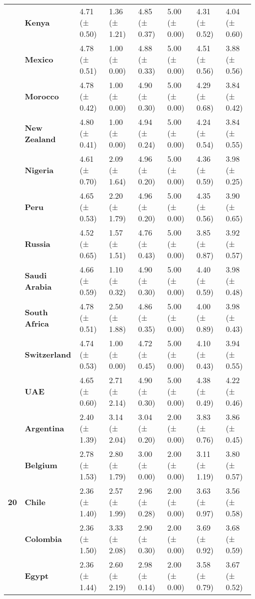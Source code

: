 \begin{tabular}{llllllll}
\textbf{} & \textbf{Kenya} & 4.71 (± 0.50) & 1.36 (± 1.21) & 4.85 (± 0.37) & 5.00 (± 0.00) & 4.31 (± 0.52) & 4.04 (± 0.60) \\
\textbf{} & \textbf{Mexico} & 4.78 (± 0.51) & 1.00 (± 0.00) & 4.88 (± 0.33) & 5.00 (± 0.00) & 4.51 (± 0.56) & 3.88 (± 0.56) \\
\textbf{} & \textbf{Morocco} & 4.78 (± 0.42) & 1.00 (± 0.00) & 4.90 (± 0.30) & 5.00 (± 0.00) & 4.29 (± 0.68) & 3.84 (± 0.42) \\
\textbf{} & \textbf{New Zealand} & 4.80 (± 0.41) & 1.00 (± 0.00) & 4.94 (± 0.24) & 5.00 (± 0.00) & 4.24 (± 0.54) & 3.84 (± 0.55) \\
\textbf{} & \textbf{Nigeria} & 4.61 (± 0.70) & 2.09 (± 1.64) & 4.96 (± 0.20) & 5.00 (± 0.00) & 4.36 (± 0.59) & 3.98 (± 0.25) \\
\textbf{} & \textbf{Peru} & 4.65 (± 0.53) & 2.20 (± 1.79) & 4.96 (± 0.20) & 5.00 (± 0.00) & 4.35 (± 0.56) & 3.90 (± 0.65) \\
\textbf{} & \textbf{Russia} & 4.52 (± 0.65) & 1.57 (± 1.51) & 4.76 (± 0.43) & 5.00 (± 0.00) & 3.85 (± 0.87) & 3.92 (± 0.57) \\
\textbf{} & \textbf{Saudi Arabia} & 4.66 (± 0.59) & 1.10 (± 0.32) & 4.90 (± 0.30) & 5.00 (± 0.00) & 4.40 (± 0.59) & 3.98 (± 0.48) \\
\textbf{} & \textbf{South Africa} & 4.78 (± 0.51) & 2.50 (± 1.88) & 4.86 (± 0.35) & 5.00 (± 0.00) & 4.00 (± 0.89) & 3.98 (± 0.43) \\
\textbf{} & \textbf{Switzerland} & 4.74 (± 0.53) & 1.00 (± 0.00) & 4.72 (± 0.45) & 5.00 (± 0.00) & 4.10 (± 0.43) & 3.94 (± 0.55) \\
\textbf{} & \textbf{UAE} & 4.65 (± 0.60) & 2.71 (± 2.14) & 4.90 (± 0.30) & 5.00 (± 0.00) & 4.38 (± 0.49) & 4.22 (± 0.46) \\
\cline{1-8}
\multirow[t]{19}{*}{\textbf{20}} & \textbf{Argentina} & 2.40 (± 1.39) & 3.14 (± 2.04) & 3.04 (± 0.20) & 2.00 (± 0.00) & 3.83 (± 0.76) & 3.86 (± 0.45) \\
\textbf{} & \textbf{Belgium} & 2.78 (± 1.53) & 2.80 (± 1.79) & 3.00 (± 0.00) & 2.00 (± 0.00) & 3.11 (± 1.19) & 3.80 (± 0.57) \\
\textbf{} & \textbf{Chile} & 2.36 (± 1.40) & 2.57 (± 1.99) & 2.96 (± 0.28) & 2.00 (± 0.00) & 3.63 (± 0.97) & 3.56 (± 0.58) \\
\textbf{} & \textbf{Colombia} & 2.36 (± 1.50) & 3.33 (± 2.08) & 2.90 (± 0.30) & 2.00 (± 0.00) & 3.69 (± 0.92) & 3.68 (± 0.59) \\
\textbf{} & \textbf{Egypt} & 2.36 (± 1.44) & 2.60 (± 2.19) & 2.98 (± 0.14) & 2.00 (± 0.00) & 3.58 (± 0.79) & 3.67 (± 0.52) \\

\end{tabular}
